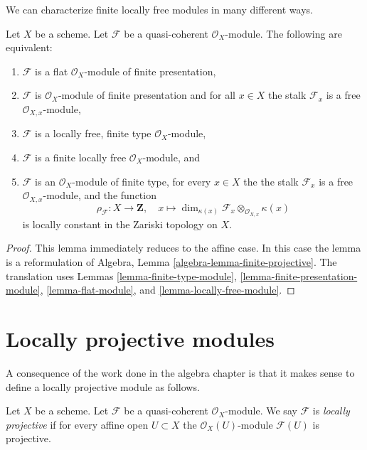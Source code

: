 \noindent
We can characterize finite locally free modules in many different ways.

\begin{lemma}
\label{lemma-finite-locally-free}
Let $X$ be a scheme.
Let $\mathcal{F}$ be a quasi-coherent $\mathcal{O}_X$-module.
The following are equivalent:
\begin{enumerate}
\item $\mathcal{F}$ is a flat $\mathcal{O}_X$-module of finite presentation,
\item $\mathcal{F}$ is $\mathcal{O}_X$-module of finite presentation and
for all $x \in X$ the stalk $\mathcal{F}_x$ is a free
$\mathcal{O}_{X, x}$-module,
\item $\mathcal{F}$ is a locally free, finite type $\mathcal{O}_X$-module,
\item $\mathcal{F}$ is a finite locally free $\mathcal{O}_X$-module, and
\item $\mathcal{F}$ is an $\mathcal{O}_X$-module of finite type,
for every $x \in X$ the the stalk $\mathcal{F}_x$ is a free
$\mathcal{O}_{X, x}$-module, and the function
$$
\rho_{\mathcal{F}} : X \to \mathbf{Z},\quad
x \longmapsto
\dim_{\kappa(x)} \mathcal{F}_x \otimes_{\mathcal{O}_{X, x}} \kappa(x)
$$
is locally constant in the Zariski topology on $X$.
\end{enumerate}
\end{lemma}

\begin{proof}
This lemma immediately reduces to the affine case.
In this case the lemma is a reformulation of
Algebra, Lemma \ref{algebra-lemma-finite-projective}.
The translation uses
Lemmas \ref{lemma-finite-type-module},
\ref{lemma-finite-presentation-module},
\ref{lemma-flat-module}, and
\ref{lemma-locally-free-module}.
\end{proof}






\section{Locally projective modules}
\label{section-locally-projective}

\noindent
A consequence of the work done in the algebra chapter is that it
makes sense to define a locally projective module as follows.

\begin{definition}
\label{definition-locally-projective}
Let $X$ be a scheme. Let $\mathcal{F}$ be a quasi-coherent
$\mathcal{O}_X$-module. We say $\mathcal{F}$ is {\it locally projective}
if for every affine open $U \subset X$ the $\mathcal{O}_X(U)$-module
$\mathcal{F}(U)$ is projective.
\end{definition}

